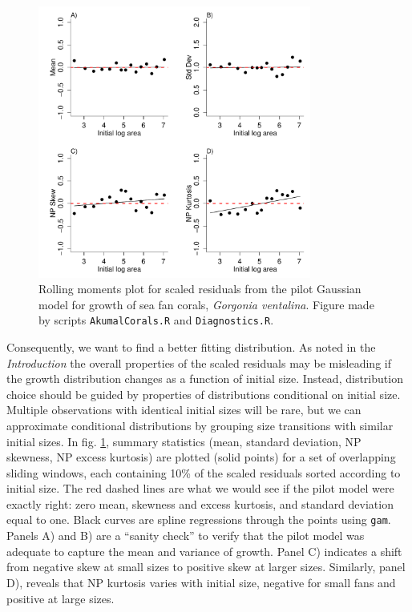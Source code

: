 \documentclass[12pt]{article}
\begin{document}
\begin{figure}[tbp]
\centering
\includegraphics[width=0.8\textwidth]{figures/AkumalRollingResiduals.pdf}
\caption{Rolling moments plot for scaled residuals from the pilot Gaussian model for growth of sea fan corals, \emph{Gorgonia ventalina}. 
Figure made by scripts \texttt{AkumalCorals.R} and \texttt{Diagnostics.R}.}
\label{fig:AkumalRollingResiduals}
\end{figure} 

Consequently, we want to find a better fitting distribution. As noted in the \emph{Introduction} the overall properties of the scaled 
residuals may be misleading if the growth distribution changes as a function of initial size. 
Instead, distribution choice should be guided by properties of distributions conditional on initial size. 
Multiple observations with identical initial sizes will be rare, but we can 
approximate conditional distributions by grouping size transitions with similar initial sizes. 
In fig. \ref{fig:AkumalRollingResiduals}, summary statistics (mean, standard deviation, NP skewness, NP excess kurtosis) 
are plotted (solid points) for a set of overlapping sliding windows, each containing 10\% of the scaled residuals sorted according to initial size. 
The red dashed lines are what we would see if the pilot model were exactly right: zero mean, skewness and excess kurtosis, and 
standard deviation equal to one. Black curves are spline regressions through the points using \texttt{gam}. Panels A) and B) are a ``sanity check'' to verify
that the pilot model was adequate to capture the mean and variance of growth. Panel C) indicates a shift from negative
skew at small sizes to positive skew at larger sizes. Similarly, panel D), reveals that NP kurtosis varies with initial size, 
negative for small fans and positive at large sizes. 
\end{document}
